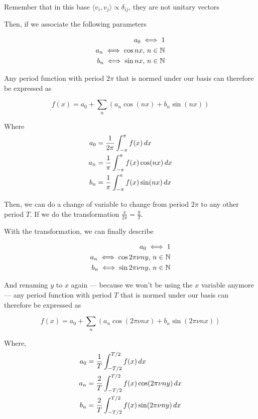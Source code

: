 \documentclass[../main/main.tex]{subfiles}
\begin{document}
Remember that in this base $\langle v_{i},v_{j}\!\rangle \propto \delta_{ij}$, they are not unitary vectors

Then, if we associate the following parameters

\begin{align*}
	a_{0} \iff {1}                   \\
	a_{n} \iff {\cos nx},\, n \in \mathbb{N} \\
	b_{n} \iff {\sin nx} ,\,n \in \mathbb{N} \\
\end{align*}

Any period function with period $2\pi$ that is normed under our basis can therefore be expressed as

\begin{equation}
	f(x) = a_{0} + \sum_{n}\left(a_{n} \cos (nx) + b_{n} \sin(nx)\right)
\end{equation}


Where
\begin{align}
	a_{0} & = \frac{1}{2\pi} \fourierint{f(x)}         \\
	a_{n} & = \frac{1}{\pi} \fourierint{f(x) \cos(nx)} \\
	b_{n} & = \frac{1}{\pi} \fourierint{f(x) \sin(nx)}
\end{align}

Then, we can do a change of variable to change from period $2\pi$ to any other period $T$. If we do the transformation $\frac{x}{2\pi} = \frac{y}{T}$.

With the transformation, we can finally describe


\begin{align*}
	a_{0} \iff {1}                             \\
	a_{n} \iff {\cos 2\pi \nu n y},\, n \in \mathbb{N} \\
	b_{n} \iff {\sin 2\pi \nu n y} ,\,n \in \mathbb{N} \\
\end{align*}

And renaming $y$ to $x$ again --- because we won't be using the $x$ variable anymore --- any period function with period $T$ that is normed under our basis can therefore be expressed as

\begin{equation}
	f(x) = a_{0} + \sum_{n}\left(a_{n} \cos ( 2\pi \nu n x) + b_{n} \sin( 2\pi \nu n x)\right)
\end{equation}


Where,
\begin{align}
	a_{0} & = \frac{1}{T} \fourier[-T/2][T/2]{f(x)}                    \\
	a_{n} & = \frac{2}{T} \fourier[-T/2][T/2]{f(x) \cos(2\pi \nu n y)} \\
	b_{n} & = \frac{2}{T} \fourier[-T/2][T/2]{f(x) \sin(2\pi \nu n y)}
\end{align}
\end{document}
